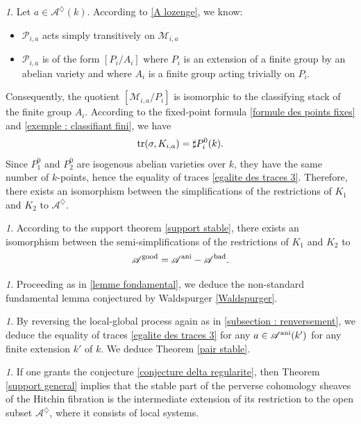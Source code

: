 \documentclass[12pt,english]{smfart}
\numberwithin{equation}{subsection}
\theoremstyle{remark}
\newtheorem{numero}[equation]{}
\newcommand\calA{{\mathscr A}}
\newcommand\calP{{\mathscr P}}
\newcommand\calM{{\mathscr M}}
\newcommand\tr{{\rm tr}}
\newcommand\ani{{\rm ani}}
\begin{document}
\begin{numero}
Let $a\in\calA^\diamondsuit(k)$. According to \ref{A lozenge}, we know:
\begin{itemize}
 \item $\calP_{i,a}$ acts simply transitively on $\calM_{i,a}$
 \item $\calP_{i,a}$ is of the form $[P_i/ A_i]$ where $P_i$ is an
   extension of a finite group by an abelian variety and where
   $A_i$ is a finite group acting trivially on $P_i$.
\end{itemize}
Consequently, the quotient $[\calM_{i,a}/ P_i]$ is isomorphic to the
classifying stack of the finite group $A_i$. According to the fixed-point formula
\ref{formule des points fixes} and \ref{exemple : classifiant fini}, we have
$$\tr(\sigma,K_{i,a})=\sharp P_i^0(k).$$
Since $P_1^0$ and $P_2^0$ are isogenous abelian varieties over
$k$, they have the same number of $k$-points, hence the equality of traces
\ref{egalite des traces 3}. Therefore, there exists an isomorphism between the
simplifications of the restrictions of $K_1$ and $K_2$ to
$\calA^\diamondsuit$.
\end{numero}

\begin{numero}
According to the support theorem \ref{support stable}, there exists an
isomorphism between the semi-simplifications of the restrictions of $K_1$ and $K_2$
to
$$\calA^{\rm good}=\calA^{\rm ani}-\calA^{\rm bad}.$$
\end{numero}

\begin{numero}
Proceeding as in \ref{lemme fondamental}, we deduce the
non-standard fundamental lemma conjectured by Waldspurger
\ref{Waldspurger}.
\end{numero}

\begin{numero}
By reversing the local-global process again as in
\ref{subsection : renversement}, we deduce the equality of traces
\ref{egalite des traces 3} for any $a\in \calA^\ani(k')$ for any
finite extension $k'$ of $k$. We deduce Theorem \ref{pair stable}.
\end{numero}

\begin{numero}
If one grants the conjecture \ref{conjecture delta regularite}, then Theorem \ref{support general} implies that the stable part of the perverse cohomology sheaves of the Hitchin fibration is the intermediate extension of its restriction to the open subset $\calA^\diamondsuit$, where it consists of local systems.
\end{numero}
\end{document}
